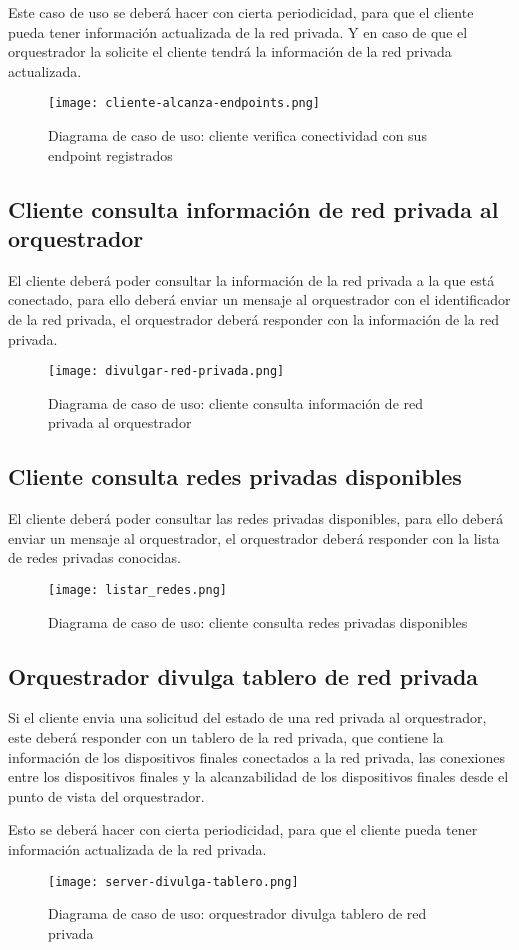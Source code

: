 Este caso de uso se deberá hacer con cierta periodicidad, para que el cliente pueda tener información actualizada de la red privada. Y en caso de que el orquestrador la solicite el cliente tendrá la información de la red privada actualizada.

\begin{figure}[h!]
    \centering
    \texttt{[image: cliente-alcanza-endpoints.png]}
    \caption{Diagrama de caso de uso: cliente verifica conectividad con sus endpoint registrados}
\end{figure}

\newpage
\subsection{Cliente consulta información de red privada al orquestrador}
El cliente deberá poder consultar la información de la red privada a la que está conectado, para ello deberá enviar un mensaje al orquestrador con el identificador de la red privada, el orquestrador deberá responder con la información de la red privada.

\begin{figure}[h!]
    \centering
    \texttt{[image: divulgar-red-privada.png]}
    \caption{Diagrama de caso de uso: cliente consulta información de red privada al orquestrador}
\end{figure}


\subsection{Cliente consulta redes privadas disponibles}
El cliente deberá poder consultar las redes privadas disponibles, para ello deberá enviar un mensaje al orquestrador, el orquestrador deberá responder con la lista de redes privadas conocidas.

\begin{figure}[h!]
    \centering
    \texttt{[image: listar\_redes.png]}
    \caption{Diagrama de caso de uso: cliente consulta redes privadas disponibles}
\end{figure}

\subsection{Orquestrador divulga tablero de red privada}
Si el cliente envia una solicitud del estado de una red privada al orquestrador, este deberá responder con un tablero de la red privada, que contiene la información de los dispositivos finales conectados a la red privada, las conexiones entre los dispositivos finales y la alcanzabilidad de los dispositivos finales desde el punto de vista del orquestrador.

Esto se deberá hacer con cierta periodicidad, para que el cliente pueda tener información actualizada de la red privada.

\begin{figure}[h!]
    \centering
    \texttt{[image: server-divulga-tablero.png]}
    \caption{Diagrama de caso de uso: orquestrador divulga tablero de red privada}
\end{figure}


